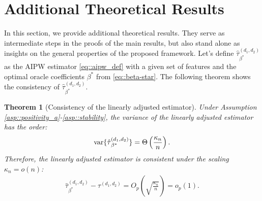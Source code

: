 \documentclass[twoside,letterpaper]{article}
\theoremstyle{plain}
\newtheorem{theorem}{Theorem}[section]
\theoremstyle{definition}
\theoremstyle{remark}
\newcommand{\var}{\textup{var}}
\begin{document}
\section{Additional Theoretical Results}
In this section, we provide additional theoretical results. They serve as intermediate steps in the proofs of the main results, but also stand alone as insights on the general properties of the proposed framework. Let's define $\hat\tau{}^{(d_1, d_2)}_{\beta^*}$ as the AIPW estimator \eqref{eq::aipw_def} with a given set of features and the optimal oracle coefficients $\beta^*$ from \eqref{eq::beta-star}. The following theorem shows the consistency of $\hat\tau{}^{(d_1, d_2)}_{\beta^*}$.
\begin{theorem}[Consistency of the linearly adjusted estimator]\label{thm:consistency}
    Under Assumption \ref{asp::positivity_a}-\ref{asp::stability}, the variance of the linearly adjusted estimator has the order:
    \begin{eqnarray}\label{eq::variance_rate}
        \var\{\hat\tau{}^{(d_1, d_2)}_{\beta^*}\} = \Theta\left(\frac{\kappa_n}{n}\right).
    \end{eqnarray}
    Therefore, the linearly adjusted estimator is consistent under the scaling $\kappa_n = o(n)$:
    \begin{align*}
        \hat\tau{}^{(d_1, d_2)}_{\beta^*} - \tau^{(d_1, d_2)} = O_{p}\left(\sqrt{\frac{\kappa_n}{n}}\right) = o_p(1). 
    \end{align*}
    
\end{theorem}
\end{document}
